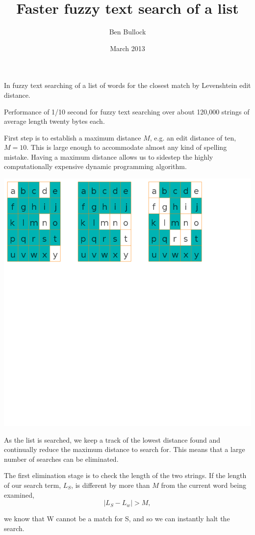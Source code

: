\documentclass{article}
\title{Faster fuzzy text search of a list}
\author{Ben Bullock}
\date{March 2013}
\begin{document}
\maketitle


In fuzzy text searching of a list of words for the closest match by
Levenshtein edit distance.

Performance of 1/10 second for fuzzy text searching over about 120,000
strings of average length twenty bytes each.

First step is to establish a maximum distance $M$, e.g. an edit
distance of ten, $M=10$. This is large enough to accommodate almost
any kind of spelling mistake. Having a maximum distance allows us to
sidestep the highly computationally expensive dynamic programming
algorithm.

\includegraphics{output.png}

As the list is searched, we keep a track of the lowest distance found
and continually reduce the maximum distance to search for. This means
that a large number of searches can be eliminated.

The first elimination stage is to check the length of the two
strings. If the length of our search term, $L_{S}$, is different
by more than $M$ from the current word being examined, 
$$|L_{S} - L_{w}| > M,$$ 

we know that W cannot be a match for S, and so we can instantly halt
the search.
\end{document}
